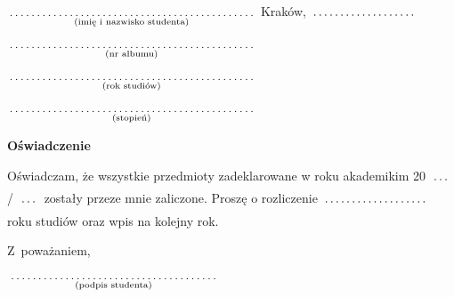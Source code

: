 \documentclass[a4paper,8pt]{article}
\newcommand{\fillField}[2]{
    $\underset{\text{#1}}{\parbox[t]{#2}{\dotfill}}$
}
\begin{document}
\noindent
\fillField{(imię i nazwisko studenta)}{7cm} \hfill Kraków, \fillField{}{3cm} \\\\
\fillField{(nr albumu)}{7cm} \\\\
\fillField{(rok studiów)}{7cm} \\\\
\fillField{(stopień)}{7cm} \\

\vskip 2.0cm

\begin{center}
{\Large \textbf{Oświadczenie}}
\end{center}

\vskip 0.5cm

Oświadczam, że wszystkie przedmioty zadeklarowane w roku akademikim 20\fillField{}{0.6cm}/\fillField{}{0.6cm} zostały przeze mnie zaliczone. Proszę o rozliczenie \fillField{}{3cm} roku studiów oraz wpis na kolejny rok.
\vskip 2.0cm

\hspace{\fill} Z~poważaniem, \hspace{2.8cm} \\\\
\null\hfill\fillField{(podpis studenta)}{6cm}%
\vskip 4.0cm
\end{document}
